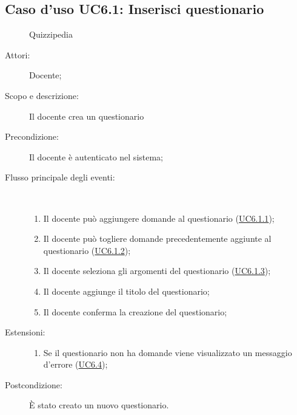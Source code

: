 \subsection{Caso d'uso UC6.1: Inserisci questionario}
	\begin{figure}[H]
		\centering
		\begin{resizedtikzpicture}{\textwidth}
		\begin{umlsystem}[x=0, fill=lightgray!20]{Quizzipedia}
		\end{umlsystem}
		\end{resizedtikzpicture}
		\caption{}
	\end{figure}
\begin{description}
\item[Attori:] Docente;
\item[Scopo e descrizione:] Il docente crea un questionario
      \item[Precondizione:] Il docente è autenticato nel sistema;

        \item[Flusso principale degli eventi:] \ 
 \begin{enumerate}
          \item Il docente può aggiungere domande al questionario (\hyperlink{UC6.1.1}{UC6.1.1});
          \item Il docente può togliere domande precedentemente aggiunte al questionario (\hyperlink{UC6.1.2}{UC6.1.2});
          \item Il docente seleziona gli argomenti del questionario (\hyperlink{UC6.1.3}{UC6.1.3});
          \item Il docente aggiunge il titolo del questionario;
          \item Il docente conferma la creazione del questionario;

      \end{enumerate}
    \item[Estensioni:]
      \begin{enumerate}
          \item Se il questionario non ha domande viene visualizzato un messaggio d'errore (\hyperlink{UC6.4}{UC6.4});

      \end{enumerate}
    \item[Postcondizione:] È stato creato un nuovo questionario.
  \end{description}
\hypertarget{UC6.1.1}{}

